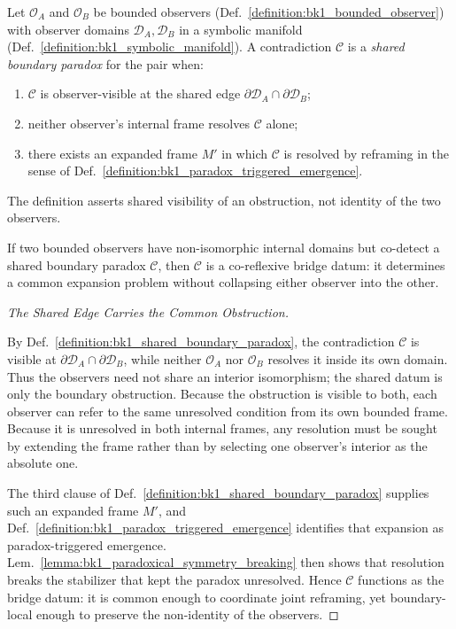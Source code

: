\begin{definition}
\label{definition:bk1_shared_boundary_paradox}
Let \(\mathcal{O}_A\) and \(\mathcal{O}_B\) be bounded observers
(Def.~\ref{definition:bk1_bounded_observer}) with observer domains
\(\mathcal{D}_A,\mathcal{D}_B\) in a symbolic manifold
(Def.~\ref{definition:bk1_symbolic_manifold}). A contradiction
\(\mathcal{C}\) is a \emph{shared boundary paradox} for the pair when:
\begin{enumerate}
  \item \(\mathcal{C}\) is observer-visible at the shared edge
  \(\partial\mathcal{D}_A\cap\partial\mathcal{D}_B\);
  \item neither observer's internal frame resolves \(\mathcal{C}\) alone;
  \item there exists an expanded frame \(M'\) in which \(\mathcal{C}\) is
  resolved by reframing in the sense of
  Def.~\ref{definition:bk1_paradox_triggered_emergence}.
\end{enumerate}
The definition asserts shared visibility of an obstruction, not identity of the
two observers.
\end{definition}

\begin{theorem}
\label{theorem:bk1_shared_paradox_bridge_datum}
If two bounded observers have non-isomorphic internal domains but co-detect a
shared boundary paradox \(\mathcal{C}\), then \(\mathcal{C}\) is a
co-reflexive bridge datum: it determines a common expansion problem without
collapsing either observer into the other.
\end{theorem}
\begin{proof}[The Shared Edge Carries the Common Obstruction]
\label{proof:bk1_shared_paradox_bridge_datum}
\leavevmode

By Def.~\ref{definition:bk1_shared_boundary_paradox}, the contradiction
\(\mathcal{C}\) is visible at
\(\partial\mathcal{D}_A\cap\partial\mathcal{D}_B\), while neither
\(\mathcal{O}_A\) nor \(\mathcal{O}_B\) resolves it inside its own domain. Thus
the observers need not share an interior isomorphism; the shared datum is only
the boundary obstruction. Because the obstruction is visible to both, each
observer can refer to the same unresolved condition from its own bounded frame.
Because it is unresolved in both internal frames, any resolution must be sought
by extending the frame rather than by selecting one observer's interior as the
absolute one.

The third clause of Def.~\ref{definition:bk1_shared_boundary_paradox} supplies
such an expanded frame \(M'\), and Def.~\ref{definition:bk1_paradox_triggered_emergence}
identifies that expansion as paradox-triggered emergence. Lem.~\ref{lemma:bk1_paradoxical_symmetry_breaking}
then shows that resolution breaks the stabilizer that kept the paradox
unresolved. Hence \(\mathcal{C}\) functions as the bridge datum: it is common
enough to coordinate joint reframing, yet boundary-local enough to preserve the
non-identity of the observers.
\end{proof}

